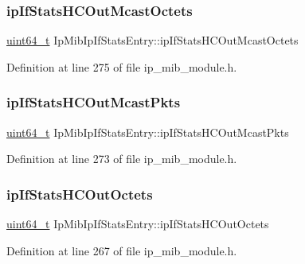 \subsubsection{\texorpdfstring{ip\+If\+Stats\+H\+C\+Out\+Mcast\+Octets}{ipIfStatsHCOutMcastOctets}}
{\footnotesize\ttfamily \hyperlink{stdint_8h_aec6fcb673ff035718c238c8c9d544c47}{uint64\+\_\+t} Ip\+Mib\+Ip\+If\+Stats\+Entry\+::ip\+If\+Stats\+H\+C\+Out\+Mcast\+Octets}



Definition at line 275 of file ip\+\_\+mib\+\_\+module.\+h.

\mbox{\label{structIpMibIpIfStatsEntry_a885621d48e5b72f7de7935a504c6fcb5}} 
\subsubsection{\texorpdfstring{ip\+If\+Stats\+H\+C\+Out\+Mcast\+Pkts}{ipIfStatsHCOutMcastPkts}}
{\footnotesize\ttfamily \hyperlink{stdint_8h_aec6fcb673ff035718c238c8c9d544c47}{uint64\+\_\+t} Ip\+Mib\+Ip\+If\+Stats\+Entry\+::ip\+If\+Stats\+H\+C\+Out\+Mcast\+Pkts}



Definition at line 273 of file ip\+\_\+mib\+\_\+module.\+h.

\mbox{\label{structIpMibIpIfStatsEntry_acfe113e5bf1b1fb5d7cfe472f760561a}} 
\subsubsection{\texorpdfstring{ip\+If\+Stats\+H\+C\+Out\+Octets}{ipIfStatsHCOutOctets}}
{\footnotesize\ttfamily \hyperlink{stdint_8h_aec6fcb673ff035718c238c8c9d544c47}{uint64\+\_\+t} Ip\+Mib\+Ip\+If\+Stats\+Entry\+::ip\+If\+Stats\+H\+C\+Out\+Octets}



Definition at line 267 of file ip\+\_\+mib\+\_\+module.\+h.

